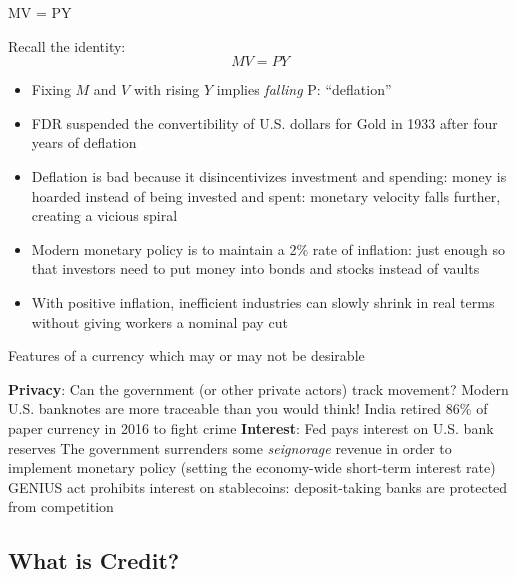 \documentclass[aspectratio=169]{beamer}
\begin{document}
\begin{frame}{MV = PY}

Recall the identity: 
$$MV = PY$$

\pause 


\begin{itemize}
    \item Fixing $M$ and $V$ with rising $Y$ implies \emph{falling} P: ``deflation''
    \item FDR suspended the convertibility of U.S. dollars for Gold in 1933 after four years of deflation \pause 
    \item Deflation is bad because it disincentivizes investment and spending: money is hoarded instead of being invested and spent: monetary velocity falls further, creating a vicious spiral \pause 
    \item Modern monetary policy is to maintain a 2\% rate of inflation: just enough so that investors need to put money into bonds and stocks instead of vaults 
    \item With positive inflation, inefficient industries can slowly shrink in real terms without giving workers a nominal pay cut 
\end{itemize}
    
\end{frame}



\begin{frame}{Features of a currency which may or may not be desirable}

\bi 
\m \textbf{Privacy}: Can the government (or other private actors) track movement?
\bi 
\m Modern U.S. banknotes are more traceable than you would think! \pause 
\m India retired 86\% of paper currency in 2016 to fight crime \pause 
\ei 
\m \textbf{Interest}: Fed pays interest on U.S. bank reserves 
\bi 
\m The government surrenders some \emph{seignorage} revenue in order to implement monetary policy (setting the economy-wide short-term interest rate) 
 GENIUS act prohibits interest on stablecoins: deposit-taking banks are protected from competition 
\ei 
\ei 
    
\end{frame}



\subsection{What is Credit?}
\end{document}
